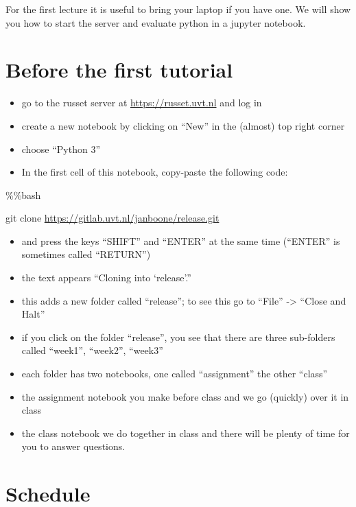 \documentclass[]{book}
\providecommand{\tightlist}{%
  \setlength{\itemsep}{0pt}\setlength{\parskip}{0pt}}
\begin{document}
For the first lecture it is useful to bring your laptop if you have one. We will show you how to start the server and evaluate python in a jupyter notebook.

\hypertarget{before-the-first-tutorial}{%
\section{Before the first tutorial}\label{before-the-first-tutorial}}

\begin{itemize}
\tightlist
\item
  go to the russet server at \url{https://russet.uvt.nl} and log in
\item
  create a new notebook by clicking on ``New'' in the (almost) top right corner
\item
  choose ``Python 3''
\item
  In the first cell of this notebook, copy-paste the following code:
\end{itemize}

\%\%bash

git clone \url{https://gitlab.uvt.nl/janboone/release.git}

\begin{itemize}
\tightlist
\item
  and press the keys ``SHIFT'' and ``ENTER'' at the same time (``ENTER'' is sometimes called ``RETURN'')
\item
  the text appears ``Cloning into `release'.''
\item
  this adds a new folder called ``release''; to see this go to ``File'' -\textgreater{} ``Close and Halt''
\item
  if you click on the folder ``release'', you see that there are three sub-folders called ``week1'', ``week2'', ``week3''
\item
  each folder has two notebooks, one called ``assignment'' the other ``class''
\item
  the assignment notebook you make before class and we go (quickly) over it in class
\item
  the class notebook we do together in class and there will be plenty of time for you to answer questions.
\end{itemize}

\hypertarget{schedule-1}{%
\section{Schedule}\label{schedule-1}}
\end{document}
